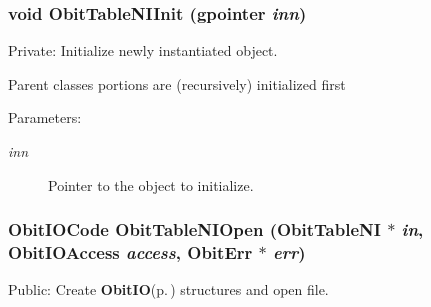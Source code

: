 \subsubsection{\setlength{\rightskip}{0pt plus 5cm}void Obit\-Table\-NIInit (gpointer {\em inn})}\label{ObitTableNI_8c_a8}


Private: Initialize newly instantiated object. 

Parent classes portions are (recursively) initialized first \begin{Desc}
\item[Parameters:]
\begin{description}
\item[{\em inn}]Pointer to the object to initialize. \end{description}
\end{Desc}
\subsubsection{\setlength{\rightskip}{0pt plus 5cm}Obit\-IOCode Obit\-Table\-NIOpen ({\bf Obit\-Table\-NI} $\ast$ {\em in}, Obit\-IOAccess {\em access}, {\bf Obit\-Err} $\ast$ {\em err})}\label{ObitTableNI_8c_a21}


Public: Create {\bf Obit\-IO}{\rm (p.\,\pageref{structObitIO})} structures and open file. 

